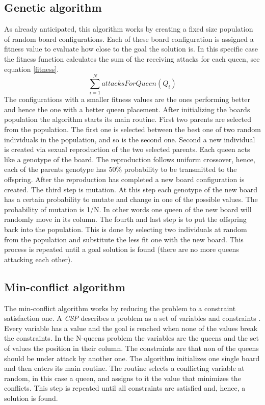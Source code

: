\documentclass[runningheads]{llncs}
\begin{document}
\subsection{Genetic algorithm}
As already anticipated, this algorithm works by creating a fixed size population
of random board configurations. Each of these board configuration is
assigned a fitness value to evaluate how close to the goal the
solution is. In this specific case the fitness function calculates the
sum of the receiving attacks for each queen, see equation \ref{fitness}. 
\begin{equation} \label{fitness}
\sum_{i=1}^{N} attacksForQueen(Q_i)
\end{equation}
The configurations with a smaller fitness values are the ones
performing better and hence the one with a better queen
placement. After initializing the boards population the algorithm
starts its main routine. First two parents are selected from the population. The
first one is selected between the best one of two random individuals
in the population, and so is the second one. Second a new individual
is created via sexual reproduction of the two selected parents. Each
queen acts like a genotype of the board. The reproduction follows
uniform crossover, hence, each of the parents genotype has 50\%
probability to be transmitted to the offspring. After the reproduction
has completed a new board configuration is created. The third step is
mutation. At this step each genotype of the new board has a certain
probability to mutate and change in one of the possible values. The
probability of mutation is 1/N. In other words one queen of the new board
will randomly move in its column. The fourth and last step is to put
the offspring back into the population. This is done by selecting two
individuals at random from the population and substitute the less fit
one with the new board. This process is repeated until a goal solution
is found (there are no more queens attacking each other).

\subsection{Min-conflict algorithm}
The min-conflict algorithm works by reducing the problem to a
constraint satisfaction one. A \textit{CSP} describes a problem as a
set of variables and constraints \cite{russel2016artificial}. Every
variable has a value and the goal is reached when none of the values
break the constraints. In the N-queens problem the variables are the queens and
the set of values the position in their column. The constraints are
that non of the queens should be under attack by another one. The
algorithm initializes one single board and then enters its main
routine. The routine selects a conflicting variable at random, in this
case a queen, and assigns to it the value that minimizes the
conflicts. This step is repeated until all constraints are satisfied
and, hence, a solution is found.
\end{document}
